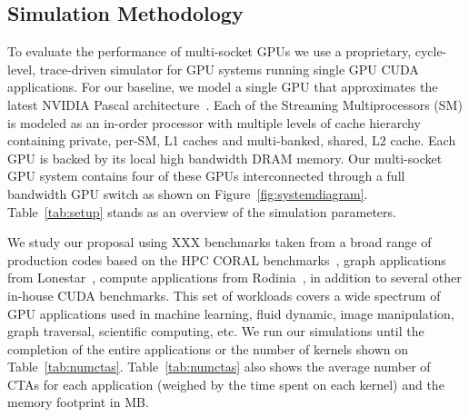 \subsection{Simulation Methodology}
\label{methodology}

To evaluate the performance of multi-socket GPUs we use a proprietary, 
cycle-level, trace-driven simulator for GPU systems running single GPU CUDA 
applications. For our baseline, we model a single GPU that approximates the 
latest NVIDIA Pascal architecture~\cite{inside-pascal}. Each of the 
Streaming Multiprocessors (SM) is modeled as an in-order processor with 
multiple levels of cache hierarchy containing private, per-SM, L1 caches and 
multi-banked, shared, L2 cache. Each GPU is backed by its local high 
bandwidth DRAM memory. Our multi-socket GPU system contains four of these 
GPUs interconnected through a full bandwidth GPU switch as shown on 
Figure~\ref{fig:systemdiagram}. Table~\ref{tab:setup} stands as an overview 
of the simulation parameters.

We study our proposal using XXX benchmarks taken from a broad range of 
production codes based on the HPC CORAL benchmarks~\cite{coral}, graph 
applications from Lonestar~\cite{lonestar}, compute applications from 
Rodinia~\cite{Che2009}, in addition to several other in-house CUDA benchmarks. 
This set of workloads covers a wide spectrum of GPU applications used in machine 
learning, fluid dynamic, image manipulation, graph traversal, scientific 
computing, etc. We run our simulations until the completion of the entire 
applications or the number of kernels shown on Table~\ref{tab:numctas}.
Table~\ref{tab:numctas} also shows the average number of CTAs for each
application (weighed by the time spent on each kernel) and the memory 
footprint in MB.

